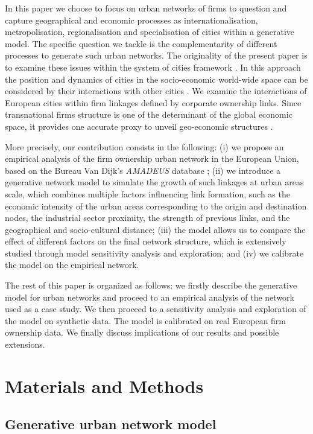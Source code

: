\documentclass[10pt,letterpaper]{article}
\begin{document}
In this paper we choose to focus on urban networks of firms to question and capture geographical and economic processes as internationalisation, metropolisation, regionalisation and specialisation of cities within a generative model. The specific question we tackle is the complementarity of different processes to generate such urban networks. The originality of the present paper is to examine these issues within the system of cities framework \cite{berry1964cities}. In this approach the position and dynamics of cities in the socio-economic world-wide space can be considered by their interactions with other cities \cite{pumain2018evolutionary}. We examine the interactions of European cities within firm linkages defined by corporate ownership links. Since transnational firms structure is one of the determinant of the global economic space, it provides one accurate proxy to unveil geo-economic structures \cite{2019arXiv191014652Z}. 

More precisely, our contribution consists in the following: (i) we propose an empirical analysis of the firm ownership urban network in the European Union, based on the Bureau Van Dijk's \emph {AMADEUS} database \cite{AMADEUS2018}; (ii) we introduce a generative network model to simulate the growth of such linkages at urban areas scale, which combines multiple factors influencing link formation, such as the economic intensity of the urban areas corresponding to the origin and destination nodes, the industrial sector proximity, the strength of previous links, and the geographical and socio-cultural distance; (iii) the model allows us to compare the effect of different factors on the final network structure, which is extensively studied through model sensitivity analysis and exploration; and (iv) we calibrate the model on the empirical network.


The rest of this paper is organized as follows: we firstly describe the generative model for urban networks and proceed to an empirical analysis of the network used as a case study. We then proceed to a sensitivity analysis and exploration of the model on synthetic data. The model is calibrated on real European firm ownership data. We finally discuss implications of our results and possible extensions.

\section*{Materials and Methods}

\subsection*{Generative urban network model}
\end{document}
